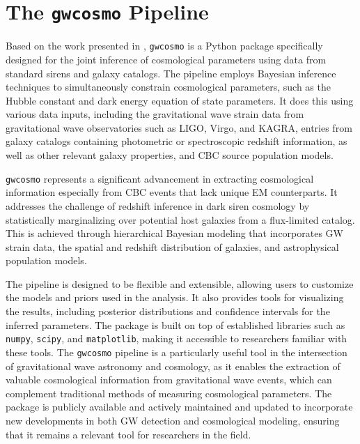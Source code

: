 \chapter{The \texttt{gwcosmo} Pipeline}
\label{chap:gwcosmo}

Based on the work presented in \cite{gray2020cosmological,gray2022pixelated,gray2023joint}, \texttt{gwcosmo} is a Python package specifically designed for the joint inference of cosmological parameters using data from standard sirens and galaxy catalogs.  The pipeline employs Bayesian inference techniques to simultaneously constrain cosmological parameters, such as the Hubble constant and dark energy equation of state parameters. It does this using various data inputs, including the gravitational wave strain data from gravitational wave observatories such as LIGO, Virgo, and KAGRA, entries from galaxy catalogs containing photometric or spectroscopic redshift information, as well as other relevant galaxy properties, and \ac{CBC} source population models. 

\texttt{gwcosmo} represents a significant advancement in extracting cosmological information especially from \ac{CBC} events that lack unique \ac{EM} counterparts. It addresses the challenge of redshift inference in dark siren cosmology by statistically marginalizing over potential host galaxies from a flux-limited catalog. This is achieved through hierarchical Bayesian modeling that incorporates \ac{GW} strain data, the spatial and redshift distribution of galaxies, and astrophysical population models.

The pipeline is designed to be flexible and extensible, allowing users to customize the models and priors used in the analysis. It also provides tools for visualizing the results, including posterior distributions and confidence intervals for the inferred parameters. The package is built on top of established libraries such as \texttt{numpy}, \texttt{scipy}, and \texttt{matplotlib}, making it accessible to researchers familiar with these tools.
The \texttt{gwcosmo} pipeline is a particularly useful tool in the intersection of gravitational wave astronomy and cosmology, as it enables the extraction of valuable cosmological information from gravitational wave events, which can complement traditional methods of measuring cosmological parameters. The package is publicly available and actively maintained and updated to incorporate new developments in both \ac{GW} detection and cosmological modeling, ensuring that it remains a relevant tool for researchers in the field.

